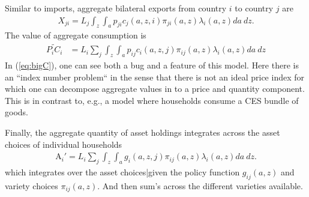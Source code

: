 \documentclass[12pt,pdftex]{article}
\begin{document}
\begin{onehalfspacing}
Similar to imports, aggregate bilateral exports from country $i$ to country $j$ are
\begin{align}
X_{ji} = L_j \int_{z} \int_{a}  p_{ji} c_{j}(a, z, i) \pi_{ji}(a, z) \lambda_i(a, z)da \ dz.
\label{eq:exports}
\end{align}
The value of aggregate consumption is
\begin{align}
\widetilde{P_{i} C_i}  &=  L_{i} \sum_{j} \int_{z} \int_{a}  p_{ij} c_{i}(a, z, j) \pi_{ij}(a, z) \lambda_i(a, z)da \ dz \label{eq:bigC}
\end{align}
In (\ref{eq:bigC}), one can see both a bug and a feature of this model. Here there is an ``index number problem`` in the sense that there is not an ideal price index for which one can decompose aggregate values in to a price and quantity component. This is in contrast to, e.g., a model where households consume a CES bundle of goods.

Finally, the aggregate quantity of asset holdings integrates across the asset choices of individual households
\begin{align}
\mathrm{A}_i' = L_{i}\sum_{j} \int_{z} \int_{a}  g_{i}(a, z, j) \pi_{ij}(a, z) \lambda_i(a, z) da \ dz.
\label{eq:aggregate_asset}
\end{align}
which integrates over the asset choices|given the policy function $g_{ij}(a, z)$ and variety choices $\pi_{ij}(a, z)$. And then sum's across the different varieties available.


\end{onehalfspacing}
\end{document}

